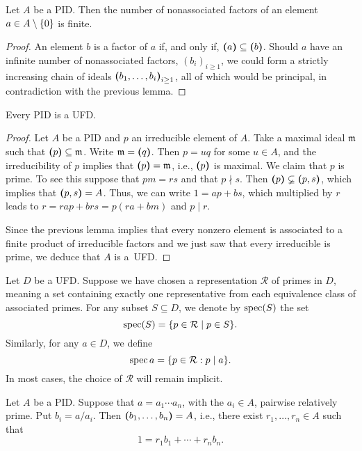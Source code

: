 \begin{lem}
    Let $A$ be a PID. Then the number of nonassociated factors of an element $a\in A\setminus\{0\}$ is finite.
\end{lem}

\begin{proof}
    An element $b$ is a factor of $a$ if, and only if, $\textrm{\boldmath$($}a\textrm{\boldmath$)$}\subseteq\textrm{\boldmath$($}b\textrm{\boldmath$)$}$. Should $a$ have an infinite number of nonassociated factors, $(b_i)_{i\ge1}$, we could form a strictly increasing chain of ideals $\textrm{\boldmath$($}b_1,\dots,b_i\textrm{\boldmath$)$}_{i\ge1}$, all of which would be principal, in contradiction with the previous lemma.
\end{proof}

\begin{thm}
    Every PID is a UFD.
\end{thm}

\begin{proof}
    Let $A$ be a PID and $p$ an irreducible element of $A$. Take a maximal ideal $\mathfrak m$ such that $\textrm{\boldmath$($}p\textrm{\boldmath$)$}\subseteq\mathfrak m$. Write $\mathfrak m=\textrm{\boldmath$($}q\textrm{\boldmath$)$}$. Then $p=uq$ for some $u\in A$, and the irreducibility of $p$ implies that $\textrm{\boldmath$($}p\textrm{\boldmath$)$}=\mathfrak m$, i.e., $\textrm{\boldmath$($}p\textrm{\boldmath$)$}$ is maximal. We claim that $p$ is prime. To see this suppose that $pm=rs$ and that $p\nmid s$. Then $\textrm{\boldmath$($}p\textrm{\boldmath$)$}\varsubsetneq\textrm{\boldmath$($}p,s\textrm{\boldmath$)$}$, which implies that $\textrm{\boldmath$($}p,s\textrm{\boldmath$)$}=A$. Thus, we can write $1=ap+bs$, which multiplied by $r$ leads to $r=rap+brs=p(ra+bm)$ and $p\mid r$.

    Since the previous lemma implies that every nonzero element is associated to a finite product of irreducible factors and we just saw that every irreducible is prime, we deduce that $A$ is a~UFD.
\end{proof}


\begin{ntn}
    Let\/ $D$ be a UFD. Suppose we have chosen a representation\/ $\mathcal{R}$ of primes in\/ $D$, meaning a set containing exactly one representative from each equivalence class of associated primes. For any subset\/ $S \subseteq D$, we denote by\/ $\operatorname{spec}(S)$ the set
    $$
    \operatorname{spec}(S) = \{p \in \mathcal{R} \mid p \in S\}.
    $$
    Similarly, for any\/ $a \in D$, we define
    $$
    \operatorname{spec}a = \{p \in \mathcal{R} : p \mid a\}.
    $$
    In most cases, the choice of\/ $\mathcal{R}$ will remain implicit.
\end{ntn}

\begin{prop}
    Let\/ $A$ be a PID. Suppose that\/ $a = a_1\cdots a_n$, with the\/ $a_i\in A$, pairwise relatively prime. Put\/ $b_i=a/a_i$. Then\/ $\textrm{\boldmath$($}b_1,\dots,b_n\textrm{\boldmath$)$}=A$, i.e., there exist\/ $r_1,\dots,r_n\in A$ such that
    $$
        1 = r_1b_1+\cdots+r_nb_n.
    $$
\end{prop}


